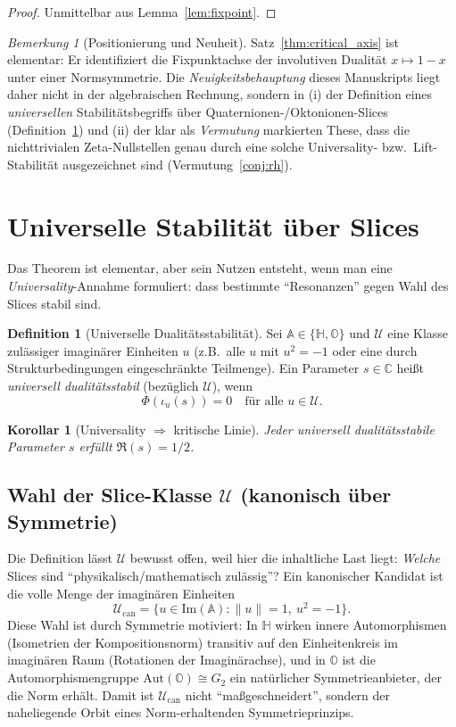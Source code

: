 \documentclass[11pt,a4paper]{article}
\theoremstyle{plain}
\newtheorem{korollar}{Korollar}
\theoremstyle{definition}
\newtheorem{definition}{Definition}
\theoremstyle{remark}
\newtheorem{bemerkung}{Bemerkung}
\newcommand{\C}{\mathbb{C}}
\newcommand{\Hh}{\mathbb{H}}
\newcommand{\Okt}{\mathbb{O}}
\begin{document}
\begin{proof}
Unmittelbar aus Lemma~\ref{lem:fixpoint}.
\end{proof}

\begin{bemerkung}[Positionierung und Neuheit]
Satz~\ref{thm:critical_axis} ist elementar: Er identifiziert die Fixpunktachse der involutiven Dualität
$x\mapsto 1-x$ unter einer Normsymmetrie.
Die \emph{Neuigkeitsbehauptung} dieses Manuskripts liegt daher nicht in der algebraischen Rechnung,
sondern in (i) der Definition eines \emph{universellen} Stabilitätsbegriffs über Quaternionen-/Oktonionen-Slices
(Definition~\ref{def:universal}) und (ii) der klar als \emph{Vermutung} markierten These,
dass die nichttrivialen Zeta-Nullstellen genau durch eine solche Universality- bzw.\ Lift-Stabilität ausgezeichnet sind
(Vermutung~\ref{conj:rh}).
\end{bemerkung}



\section{Universelle Stabilit\"at \"uber Slices}
Das Theorem ist elementar, aber sein Nutzen entsteht, wenn man eine \emph{Universality}-Annahme
formuliert: dass bestimmte ``Resonanzen'' gegen Wahl des Slices stabil sind.

\begin{definition}[Universelle Dualit\"atsstabilit\"at]\label{def:universal}
Sei $\mathbb{A}\in\{\Hh,\Okt\}$ und $\mathcal{U}$ eine Klasse zul\"assiger imagin\"arer Einheiten
$u$ (z.B.\ alle $u$ mit $u^2=-1$ oder eine durch Strukturbedingungen eingeschr\"ankte Teilmenge).
Ein Parameter $s\in\C$ hei\ss t \emph{universell dualit\"atsstabil} (bez\"uglich $\mathcal{U}$), wenn
\[
\Phi(\iota_u(s))=0\quad\text{f\"ur alle }u\in\mathcal{U}.
\]
\end{definition}

\begin{korollar}[Universality $\Rightarrow$ kritische Linie]
Jeder universell dualit\"atsstabile Parameter $s$ erf\"ullt $\Re(s)=1/2$.
\end{korollar}

\subsection*{Wahl der Slice-Klasse $\mathcal U$ (kanonisch über Symmetrie)}
Die Definition lässt $\mathcal U$ bewusst offen, weil hier die inhaltliche Last liegt:
\emph{Welche} Slices sind ``physikalisch/mathematisch zulässig''?
Ein kanonischer Kandidat ist die volle Menge der imaginären Einheiten
\[
\mathcal U_{\mathrm{can}}=\{u\in\mathrm{Im}(\mathbb A): \|u\|=1,\ u^2=-1\}.
\]
Diese Wahl ist durch Symmetrie motiviert:
In $\Hh$ wirken innere Automorphismen (Isometrien der Kompositionsnorm) transitiv auf den Einheitenkreis
im imaginären Raum (Rotationen der Imaginärachse), und in $\Okt$ ist die Automorphismengruppe
$\mathrm{Aut}(\Okt)\cong G_2$ ein natürlicher Symmetrieanbieter, der die Norm erhält.
Damit ist $\mathcal U_{\mathrm{can}}$ nicht ``maßgeschneidert'', sondern der naheliegende Orbit eines
Norm-erhaltenden Symmetrieprinzips.
\end{document}
